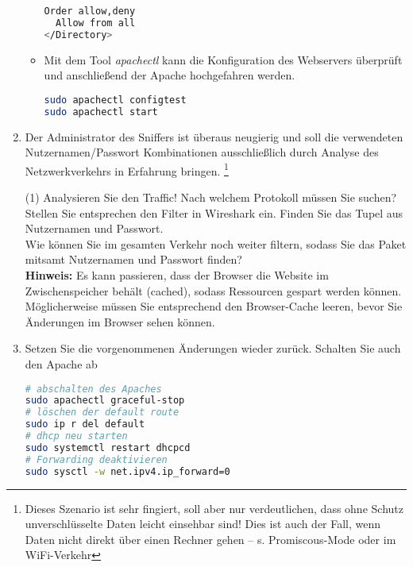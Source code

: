 \documentclass[paper=a4,fontsize=11pt]{scrartcl}%
\begin{document}
\begin{enumerate}
\begin{itemize}
\begin{lstlisting}[style=Bash, language=Bash]
  Order allow,deny
  Allow from all
</Directory>
\end{lstlisting} \label{conf}
	\item Mit dem Tool \emph{apachectl} kann die Konfiguration des Webservers überprüft und anschließend der Apache hochgefahren werden.
\begin{lstlisting}[style=Bash, language=Bash]
sudo apachectl configtest
sudo apachectl start
\end{lstlisting} \label{apchectl}
	\end{itemize}
	\item Der Administrator des Sniffers ist überaus neugierig und soll die verwendeten Nutzernamen/Passwort Kombinationen ausschließlich durch Analyse des Netzwerkverkehrs in Erfahrung bringen. \footnote{Dieses Szenario ist sehr fingiert, soll aber nur verdeutlichen, dass ohne Schutz unverschlüsselte Daten leicht einsehbar sind! Dies ist auch der Fall, wenn Daten nicht direkt über einen Rechner gehen -- s. Promiscous-Mode oder im WiFi-Verkehr}
		\begin{tasks}(1)
			\task Analysieren Sie den Traffic! Nach welchem Protokoll müssen Sie suchen?
			\task Stellen Sie entsprechen den Filter in Wireshark ein.
			\task Finden Sie das Tupel aus Nutzernamen und Passwort.\\
		Wie können Sie im gesamten Verkehr noch weiter filtern, sodass Sie das Paket mitsamt Nutzernamen und Passwort finden?\\
		\textbf{Hinweis:} Es kann passieren, dass der Browser die Website im Zwischenspeicher behält (cached), sodass Ressourcen gespart werden können. Möglicherweise müssen Sie entsprechend den Browser-Cache leeren, bevor Sie Änderungen im Browser sehen können.
		\end{tasks}
	\item Setzen Sie die vorgenommenen Änderungen wieder zurück. Schalten Sie auch den Apache ab
	\begin{lstlisting}[style=Bash, language=Bash]
# abschalten des Apaches
sudo apachectl graceful-stop
# löschen der default route
sudo ip r del default
# dhcp neu starten
sudo systemctl restart dhcpcd
# Forwarding deaktivieren
sudo sysctl -w net.ipv4.ip_forward=0
\end{lstlisting}
\end{enumerate}
\end{document}
